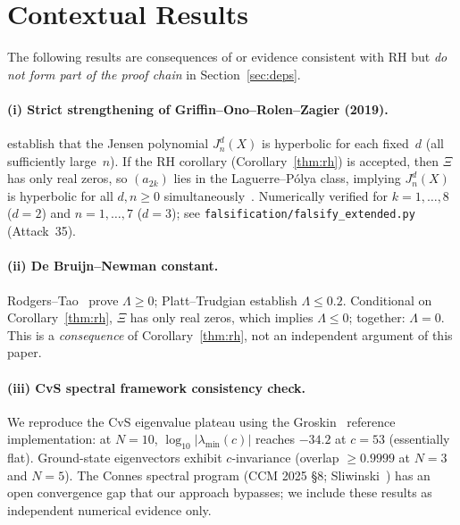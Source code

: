 \documentclass[11pt]{article}
\theoremstyle{definition}
\theoremstyle{remark}
\begin{document}
\appendix

\section{Contextual Results}\label{sec:context}

The following results are consequences of or evidence consistent with RH but
\emph{do not form part of the proof chain} in Section~\ref{sec:deps}.

\paragraph{(i) Strict strengthening of Griffin--Ono--Rolen--Zagier (2019).}
\cite{griffin2019} establish that the Jensen polynomial $J^d_n(X)$ is hyperbolic for each fixed~$d$ (all sufficiently large~$n$). If the RH corollary (Corollary~\ref{thm:rh}) is accepted, then $\Xi$ has only real zeros, so $(a_{2k})$ lies in the Laguerre--P\'olya class, implying $J^d_n(X)$ is hyperbolic for all $d, n \geq 0$ simultaneously~\cite[Theorem~2.7]{csordas1989}. Numerically verified for $k = 1,\ldots,8$ ($d=2$) and $n = 1,\ldots,7$ ($d=3$); see \texttt{falsification/falsify\_extended.py} (Attack~35).

\paragraph{(ii) De Bruijn--Newman constant.}
Rodgers--Tao~\cite{rodgers2020} prove $\Lambda \geq 0$; Platt--Trudgian establish $\Lambda \leq 0.2$.
Conditional on Corollary~\ref{thm:rh}, $\Xi$ has only real zeros, which implies $\Lambda \leq 0$;
together: $\Lambda = 0$.
This is a \emph{consequence} of Corollary~\ref{thm:rh}, not an independent argument of this paper.

\paragraph{(iii) CvS spectral framework consistency check.}
We reproduce the CvS eigenvalue plateau using the Groskin~\cite{groskin2026} reference implementation: at $N = 10$, $\log_{10}|\lambda_{\min}(c)|$ reaches $-34.2$ at $c = 53$ (essentially flat). Ground-state eigenvectors exhibit $c$-invariance (overlap $\geq 0.9999$ at $N = 3$ and $N = 5$). The Connes spectral program (CCM 2025 \S8; Sliwinski~\cite{sliwinski2026}) has an open convergence gap that our approach bypasses; we include these results as independent numerical evidence only.
\end{document}
